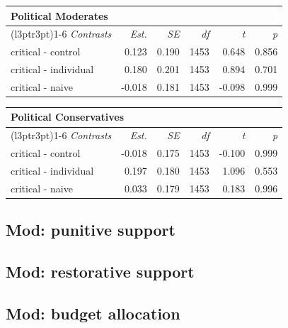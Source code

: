 \documentclass[
]{book}
\begin{document}
\begin{table}
\centering
\fontsize{13}{15}\selectfont
\begin{tabular}{lrrrrr}
\toprule
\multicolumn{6}{l}{Political Moderates} \\
\cmidrule(l{3pt}r{3pt}){1-6}
\em{Contrasts} & \em{Est.} & \em{SE} & \em{df} & \em{t} & \em{p}\\
\midrule
critical - control & 0.123 & 0.190 & 1453 & 0.648 & 0.856\\
critical - individual & 0.180 & 0.201 & 1453 & 0.894 & 0.701\\
critical - naive & -0.018 & 0.181 & 1453 & -0.098 & 0.999\\
\bottomrule
\end{tabular}
\end{table}

\begin{table}
\centering
\fontsize{13}{15}\selectfont
\begin{tabular}{lrrrrr}
\toprule
\multicolumn{6}{l}{Political Conservatives} \\
\cmidrule(l{3pt}r{3pt}){1-6}
\em{Contrasts} & \em{Est.} & \em{SE} & \em{df} & \em{t} & \em{p}\\
\midrule
critical - control & -0.018 & 0.175 & 1453 & -0.100 & 0.999\\
critical - individual & 0.197 & 0.180 & 1453 & 1.096 & 0.553\\
critical - naive & 0.033 & 0.179 & 1453 & 0.183 & 0.996\\
\bottomrule
\end{tabular}
\end{table}

\hypertarget{mod-punitive-support-1}{%
\subsection{Mod: punitive support}\label{mod-punitive-support-1}}

\hypertarget{mod-restorative-support-1}{%
\subsection{Mod: restorative support}\label{mod-restorative-support-1}}

\hypertarget{mod-budget-allocation-1}{%
\subsection{Mod: budget allocation}\label{mod-budget-allocation-1}}
\end{document}
